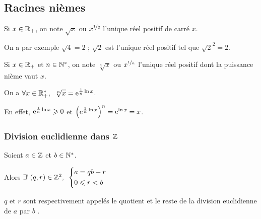 \subsection{Racines nièmes}

\begin{rappel}
Si \(x\in\mathbb{R}_+\), on note \(\sqrt{x}\) ou \(x^{\nicefrac{1}{2}}\) l'unique réel positif de carré \(x\).

On a par exemple \(\sqrt{4}=2\) ; \(\sqrt{2}\) est l'unique réel positif tel que \(\sqrt{2}^2=2\).

Si \(x\in\mathbb{R}_+\) et \(n\in\mathbb{N}^*\), on note \(\sqrt[n]{x}\) ou \(x^{\nicefrac{1}{n}}\) l'unique réel positif dont la puissance nième vaut \(x\).
\end{rappel}

\begin{rem}
On a \(\quantifs{\forall x\in\Rps}\sqrt[n]{x}=\e{\frac{1}{n}\ln x}\).

En effet, \(\mathrm{e}^{\frac{1}{n}\ln x}\geqslant0\) et \(\left(\mathrm{e}^{\frac{1}{n}\ln x}\right)^n=\mathrm{e}^{\ln x}=x\).
\end{rem}

\subsubsection{Division euclidienne dans \(\mathbb{Z}\)}

\begin{prop}
Soient \(a\in\mathbb{Z}\) et \(b\in\mathbb{N}^*\).

Alors \(\quantifs{\exists!\paren{q,r}\in\Z^2}\begin{dcases}a=qb+r \\ 0\leq r<b\end{dcases}\)

\(q\) et \(r\) sont respectivement appelés le quotient et le reste de la division euclidienne de \(a\) par \(b\) .
\end{prop}

